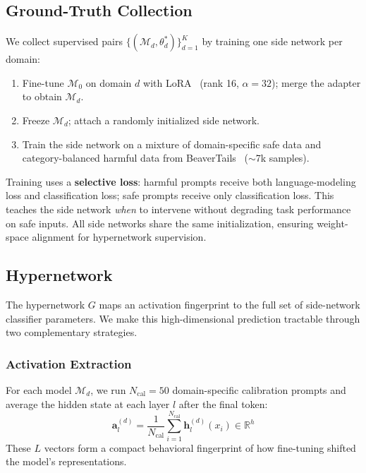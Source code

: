 \documentclass[11pt]{article}
\begin{document}
\subsection{Ground-Truth Collection}
\label{sec:gt}

We collect supervised pairs $\{(\mathcal{M}_d, \theta_d^*)\}_{d=1}^K$ by training one side network per domain:

\begin{enumerate}
    \item Fine-tune $\mathcal{M}_0$ on domain $d$ with LoRA~\cite{hu2022lora} (rank 16, $\alpha{=}32$); merge the adapter to obtain $\mathcal{M}_d$.
    \item Freeze $\mathcal{M}_d$; attach a randomly initialized side network.
    \item Train the side network on a mixture of domain-specific safe data and category-balanced harmful data from BeaverTails~\cite{ji2024beavertails} ($\sim$7k samples).
\end{enumerate}

Training uses a \textbf{selective loss}: harmful prompts receive both language-modeling loss and classification loss; safe prompts receive only classification loss. This teaches the side network \textit{when} to intervene without degrading task performance on safe inputs. All side networks share the same initialization, ensuring weight-space alignment for hypernetwork supervision.

\subsection{Hypernetwork}
\label{sec:hypernet}

The hypernetwork $G$ maps an activation fingerprint to the full set of side-network classifier parameters. We make this high-dimensional prediction tractable through two complementary strategies.

\subsubsection{Activation Extraction}

For each model $\mathcal{M}_d$, we run $N_\text{cal}{=}50$ domain-specific calibration prompts and average the hidden state at each layer $l$ after the final token:
\begin{equation}
    \mathbf{a}_l^{(d)} = \frac{1}{N_\text{cal}} \sum_{i=1}^{N_\text{cal}} \mathbf{h}_l^{(d)}(x_i) \in \mathbb{R}^{h}
\end{equation}
These $L$ vectors form a compact behavioral fingerprint of how fine-tuning shifted the model's representations.
\end{document}

